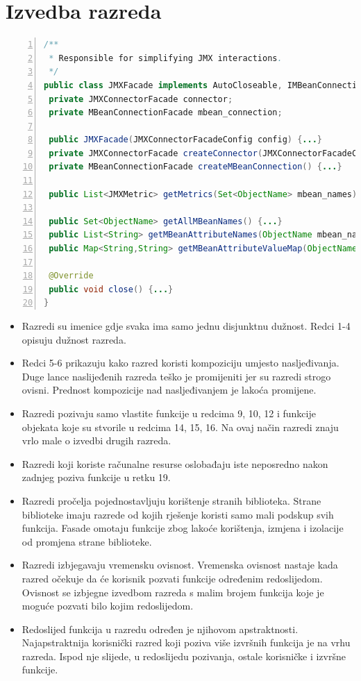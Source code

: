 \documentclass[utf8, diplomski, lmodern, numeric]{fer}
\begin{document}
\section{Izvedba razreda}

\begin{lstlisting}[floatplacement=H, language=Java, caption={Izvadak iz projekta JMXMan}, captionpos=b, basicstyle=\footnotesize, numbers=left, stepnumber=1, backgroundcolor=\color{backcolour}, keywordstyle=\color{blue}, breaklines]
/**
 * Responsible for simplifying JMX interactions.
 */
public class JMXFacade implements AutoCloseable, IMBeanConnectionFacade {
 private JMXConnectorFacade connector;
 private MBeanConnectionFacade mbean_connection;

 public JMXFacade(JMXConnectorFacadeConfig config) {...}
 private JMXConnectorFacade createConnector(JMXConnectorFacadeConfig config) {...}
 private MBeanConnectionFacade createMBeanConnection() {...}
  
 public List<JMXMetric> getMetrics(Set<ObjectName> mbean_names) {...}
  
 public Set<ObjectName> getAllMBeanNames() {...}
 public List<String> getMBeanAttributeNames(ObjectName mbean_name) {...}
 public Map<String,String> getMBeanAttributeValueMap(ObjectName mbean_name, List<String> attributes) {...}
 
 @Override
 public void close() {...}
}
\end{lstlisting}

\begin{itemize}
    \item Razredi su imenice gdje svaka ima samo jednu disjunktnu dužnost. Redci 1-4 opisuju dužnost razreda.
    \item Redci 5-6 prikazuju kako razred koristi kompoziciju umjesto nasljeđivanja. Duge lance naslijeđenih razreda teško je promijeniti jer su razredi strogo ovisni. Prednost kompozicije nad nasljeđivanjem je lakoća promijene.
    \item Razredi pozivaju samo vlastite funkcije u redcima 9, 10, 12 i funkcije objekata koje su stvorile u redcima 14, 15, 16. Na ovaj način razredi znaju vrlo male o izvedbi drugih razreda.
    \item Razredi koji koriste računalne resurse oslobađaju iste neposredno nakon zadnjeg poziva funkcije u retku 19.
    \item Razredi pročelja pojednostavljuju korištenje stranih biblioteka. Strane biblioteke imaju razrede od kojih rješenje koristi samo mali podskup svih funkcija. Fasade omotaju funkcije zbog lakoće korištenja, izmjena i izolacije od promjena strane biblioteke.
    \item Razredi izbjegavaju vremensku ovisnost. Vremenska ovisnost nastaje kada razred očekuje da će korisnik pozvati funkcije određenim redoslijedom. Ovisnost se izbjegne izvedbom razreda s malim brojem funkcija koje je moguće pozvati bilo kojim redoslijedom.
    \item Redoslijed funkcija u razredu određen je njihovom apstraktnosti. Najapstraktnija korisnički razred koji poziva više izvršnih funkcija je na vrhu razreda. Ispod nje slijede, u redoslijedu pozivanja, ostale korisničke i izvršne funkcije.
\end{itemize}
\end{document}
